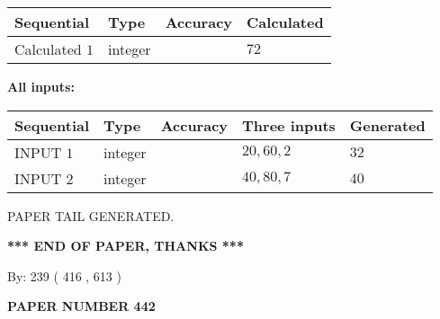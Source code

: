 \documentclass{ctexart}
\begin{document}
   
   
   
\noindent{}
   
   
  
  
\noindent\begin{tabular}{|l|l|l|l|}
\hline
 Sequential & Type & Accuracy & Calculated \\ 
\hline
 
 
  Calculated $  1 $ & integer &  & 
  $ 72 $ 
 \\  \hline  
 \end{tabular}
   
   
   
   
\noindent\vspace{0.1in}\hspace{-0.08in} {\textbf{\Large{All inputs: }}}
   
   
  
  
\noindent\begin{tabular}{|l|l|l|l|l|}
\hline
 Sequential & Type & Accuracy & Three inputs & Generated \\ 
\hline
 
 
  INPUT $  1 $ & integer &  & $
 20
 , 
 60
 , 
 2
 $ & $ 32 $ 
 \\  \hline  
 
 
  INPUT $  2 $ & integer &  & $
 40
 , 
 80
 , 
 7
 $ & $ 40 $ 
 \\  \hline  
 \end{tabular}
   
   
   
   
   
   
 \vspace{0.2in}
 
   
   
\vspace{2.0in} PAPER TAIL GENERATED.
   
   
   
   
\vspace{1.0in} 
{\textbf{\large{ *** END OF PAPER, THANKS *** }}} 
   
   
\hspace{1.0in} By: 
 239 ( 416 ,  613 )
   
   
   
   
\newpage 
\setcounter{page}{ 
   442001 } 
   
   
   
   
 {\textbf{ \Large{ PAPER NUMBER  442  }}}
   
\end{document}
